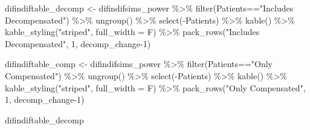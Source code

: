 \documentclass[
]{article}
\newenvironment{Shaded}{\begin{snugshade}}{\end{snugshade}}
\newcommand{\AttributeTok}[1]{\textcolor[rgb]{0.77,0.63,0.00}{#1}}
\newcommand{\DecValTok}[1]{\textcolor[rgb]{0.00,0.00,0.81}{#1}}
\newcommand{\FunctionTok}[1]{\textcolor[rgb]{0.00,0.00,0.00}{#1}}
\newcommand{\NormalTok}[1]{#1}
\newcommand{\OtherTok}[1]{\textcolor[rgb]{0.56,0.35,0.01}{#1}}
\newcommand{\SpecialCharTok}[1]{\textcolor[rgb]{0.00,0.00,0.00}{#1}}
\newcommand{\StringTok}[1]{\textcolor[rgb]{0.31,0.60,0.02}{#1}}
\begin{document}
\begin{Shaded}
\begin{Highlighting}[]
\NormalTok{difindiftable\_decomp }\OtherTok{\textless{}{-}}\NormalTok{ difindifsims\_power }\SpecialCharTok{\%\textgreater{}\%} 
  \FunctionTok{filter}\NormalTok{(Patients}\SpecialCharTok{==}\StringTok{"Includes Decompensated"}\NormalTok{) }\SpecialCharTok{\%\textgreater{}\%} 
  \FunctionTok{ungroup}\NormalTok{() }\SpecialCharTok{\%\textgreater{}\%} 
  \FunctionTok{select}\NormalTok{(}\SpecialCharTok{{-}}\NormalTok{Patients) }\SpecialCharTok{\%\textgreater{}\%} 
  \FunctionTok{kable}\NormalTok{() }\SpecialCharTok{\%\textgreater{}\%} 
  \FunctionTok{kable\_styling}\NormalTok{(}\StringTok{"striped"}\NormalTok{, }\AttributeTok{full\_width =}\NormalTok{ F) }\SpecialCharTok{\%\textgreater{}\%}
  \FunctionTok{pack\_rows}\NormalTok{(}\StringTok{"Includes Decompensated"}\NormalTok{, }\DecValTok{1}\NormalTok{, decomp\_change}\DecValTok{{-}1}\NormalTok{) }

\NormalTok{difindiftable\_comp }\OtherTok{\textless{}{-}}\NormalTok{ difindifsims\_power }\SpecialCharTok{\%\textgreater{}\%} 
  \FunctionTok{filter}\NormalTok{(Patients}\SpecialCharTok{==}\StringTok{"Only Compensated"}\NormalTok{) }\SpecialCharTok{\%\textgreater{}\%} 
  \FunctionTok{ungroup}\NormalTok{() }\SpecialCharTok{\%\textgreater{}\%} 
  \FunctionTok{select}\NormalTok{(}\SpecialCharTok{{-}}\NormalTok{Patients) }\SpecialCharTok{\%\textgreater{}\%} 
  \FunctionTok{kable}\NormalTok{() }\SpecialCharTok{\%\textgreater{}\%} 
  \FunctionTok{kable\_styling}\NormalTok{(}\StringTok{"striped"}\NormalTok{, }\AttributeTok{full\_width =}\NormalTok{ F) }\SpecialCharTok{\%\textgreater{}\%}
  \FunctionTok{pack\_rows}\NormalTok{(}\StringTok{"Only Compensated"}\NormalTok{, }\DecValTok{1}\NormalTok{, decomp\_change}\DecValTok{{-}1}\NormalTok{)}

\NormalTok{difindiftable\_decomp}
\end{Highlighting}
\end{Shaded}
\end{document}
